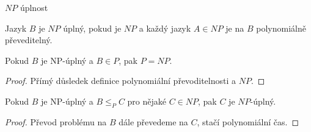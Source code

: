     \begin{frame}{$NP$ úplnost}
    \begin{definition}[$NP$ úplnost]
    Jazyk $B$ je \alert{$NP$ úplný}, pokud je $NP$ a každý jazyk $A\in NP$ je na $B$ polynomiálně převeditelný.
    \end{definition}
    \pause
    
    \begin{theorem}
    Pokud $B$ je NP-úplný a $B\in P$, pak $P=NP$.
    \end{theorem}
    \pause
    
    \begin{proof}
    Přímý důsledek definice polynomiální převoditelnosti a $NP$.
    \end{proof}
    \pause
    
    \begin{theorem}
    Pokud $B$ je NP-úplný a $B\leq_P C$ pro nějaké $C\in NP$, pak $C$ je $NP$-úplný.
    \end{theorem}
    \pause
    
    \begin{proof}
    Převod problému na $B$ dále převedeme na $C$, stačí polynomiální čas.
    \end{proof}
    \end{frame}
    
    
    
    
    
    
